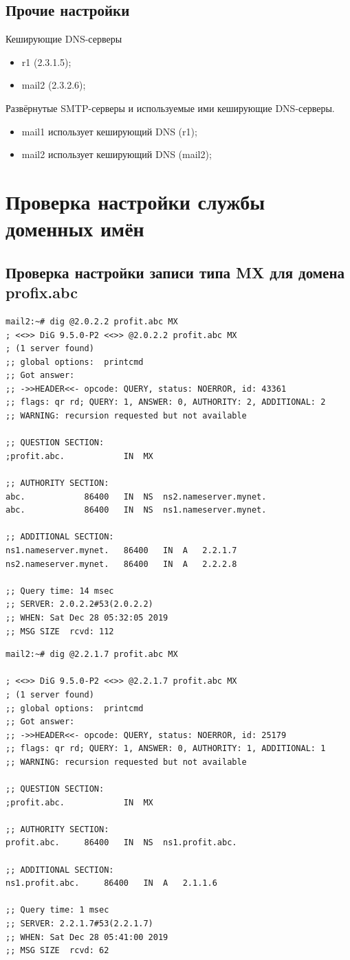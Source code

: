 \documentclass[a4paper,12pt]{article}
\begin{document}
\subsection{Прочие настройки}

Кеширующие DNS-серверы
\begin{itemize}
\item r1 (2.3.1.5);
\item mail2 (2.3.2.6);
\end{itemize}

Развёрнутые SMTP-серверы и используемые ими кеширующие DNS-серверы.
\begin{itemize}
\item mail1 использует кеширующий DNS (r1);
\item mail2 использует кеширующий DNS (mail2);
\end{itemize}


\section{Проверка настройки службы доменных имён}

\subsection{Проверка настройки записи типа MX для домена profix.abc}

\begin{verbatim}
mail2:~# dig @2.0.2.2 profit.abc MX
; <<>> DiG 9.5.0-P2 <<>> @2.0.2.2 profit.abc MX
; (1 server found)
;; global options:  printcmd
;; Got answer:
;; ->>HEADER<<- opcode: QUERY, status: NOERROR, id: 43361
;; flags: qr rd; QUERY: 1, ANSWER: 0, AUTHORITY: 2, ADDITIONAL: 2
;; WARNING: recursion requested but not available

;; QUESTION SECTION:
;profit.abc.			IN	MX

;; AUTHORITY SECTION:
abc.			86400	IN	NS	ns2.nameserver.mynet.
abc.			86400	IN	NS	ns1.nameserver.mynet.

;; ADDITIONAL SECTION:
ns1.nameserver.mynet.	86400	IN	A	2.2.1.7
ns2.nameserver.mynet.	86400	IN	A	2.2.2.8

;; Query time: 14 msec
;; SERVER: 2.0.2.2#53(2.0.2.2)
;; WHEN: Sat Dec 28 05:32:05 2019
;; MSG SIZE  rcvd: 112
\end{verbatim}

\begin{verbatim}
mail2:~# dig @2.2.1.7 profit.abc MX

; <<>> DiG 9.5.0-P2 <<>> @2.2.1.7 profit.abc MX
; (1 server found)
;; global options:  printcmd
;; Got answer:
;; ->>HEADER<<- opcode: QUERY, status: NOERROR, id: 25179
;; flags: qr rd; QUERY: 1, ANSWER: 0, AUTHORITY: 1, ADDITIONAL: 1
;; WARNING: recursion requested but not available

;; QUESTION SECTION:
;profit.abc.			IN	MX

;; AUTHORITY SECTION:
profit.abc.		86400	IN	NS	ns1.profit.abc.

;; ADDITIONAL SECTION:
ns1.profit.abc.		86400	IN	A	2.1.1.6

;; Query time: 1 msec
;; SERVER: 2.2.1.7#53(2.2.1.7)
;; WHEN: Sat Dec 28 05:41:00 2019
;; MSG SIZE  rcvd: 62
\end{verbatim}
\end{document}
